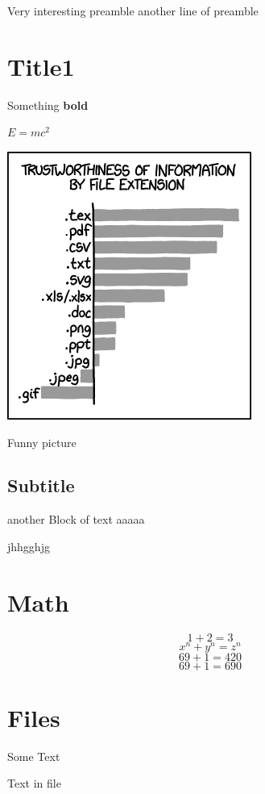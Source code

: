 Very interesting preamble
another line of preamble

\section{Title1}
Something \textbf{bold}



$E = mc^2$

\includegraphics{image.png}
\caption{Funny picture}
\subsection{Subtitle}
another Block of text
aaaaa

jhhgghjg

\section{Math}
\label{math}
$$1+2 = 3$$
\[x^n + y^n = z^n\]
\begin{displaymath}
69 + 1 = 420
\end{displaymath}
\begin{equation}
69 + 1 = 690
\end{equation}
\section{Files}
Some Text


Text in file

